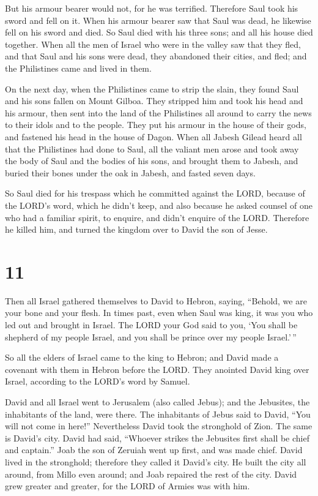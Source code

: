But his armour bearer would not, for he was terrified. Therefore Saul
took his sword and fell on it.  When his armour bearer saw
that Saul was dead, he likewise fell on his sword and died.
 So Saul died with his three sons; and all his house died
together.  When all the men of Israel who were in the
valley saw that they fled, and that Saul and his sons were dead, they
abandoned their cities, and fled; and the Philistines came and lived in
them.

 On the next day, when the Philistines came to strip the
slain, they found Saul and his sons fallen on Mount Gilboa.
 They stripped him and took his head and his armour, then
sent into the land of the Philistines all around to carry the news to
their idols and to the people.  They put his armour in
the house of their gods, and fastened his head in the house of Dagon.
 When all Jabesh Gilead heard all that the Philistines
had done to Saul,  all the valiant men arose and took
away the body of Saul and the bodies of his sons, and brought them to
Jabesh, and buried their bones under the oak in Jabesh, and fasted seven
days.

 So Saul died for his trespass which he committed against
the LORD, because of the LORD's word, which he didn't keep, and also
because he asked counsel of one who had a familiar spirit, to enquire,
 and didn't enquire of the LORD. Therefore he killed him,
and turned the kingdom over to David the son of Jesse.

\hypertarget{section-10}{%
\section{11}\label{section-10}}

 Then all Israel gathered themselves to David to Hebron,
saying, ``Behold, we are your bone and your flesh.  In
times past, even when Saul was king, it was you who led out and brought
in Israel. The LORD your God said to you, `You shall be shepherd of my
people Israel, and you shall be prince over my people Israel.'\,''

 So all the elders of Israel came to the king to Hebron;
and David made a covenant with them in Hebron before the LORD. They
anointed David king over Israel, according to the LORD's word by Samuel.

 David and all Israel went to Jerusalem (also called
Jebus); and the Jebusites, the inhabitants of the land, were there.
 The inhabitants of Jebus said to David, ``You will not
come in here!'' Nevertheless David took the stronghold of Zion. The same
is David's city.  David had said, ``Whoever strikes the
Jebusites first shall be chief and captain.'' Joab the son of Zeruiah
went up first, and was made chief.  David lived in the
stronghold; therefore they called it David's city.  He
built the city all around, from Millo even around; and Joab repaired the
rest of the city.  David grew greater and greater, for the
LORD of Armies was with him.


